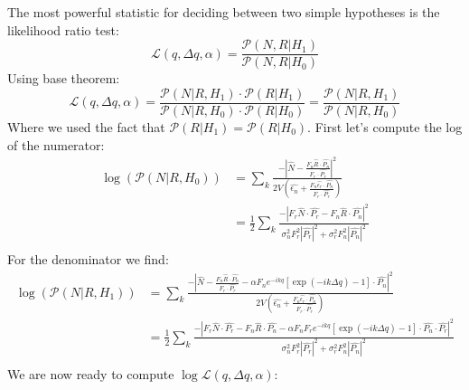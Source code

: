 \documentclass[a4paper]{article}
\newcommand{\rb}[1]{\left(#1\right)}
\newcommand{\sqb}[1]{\left[#1\right]}
\newcommand{\abs}[1]{\left|#1\right|}
\begin{document}
	The most powerful statistic for deciding between two simple hypotheses is the likelihood ratio test:
	\begin{equation}
	\mathcal{L}\rb{q,\Delta q,\alpha} = \frac{\mathcal{P}\rb{N,R|H_1}}{\mathcal{P}\rb{N,R|H_0}}
	\end{equation}
	Using base theorem:
	\begin{equation}
	\mathcal{L}\rb{q,\Delta q,\alpha} = \frac{\mathcal{P}\rb{N|R,H_1}\cdot \mathcal{P}\rb{R|H_1}}{\mathcal{P}\rb{N|R,H_0}\cdot \mathcal{P}\rb{R|H_0}} = \frac{\mathcal{P}\rb{N|R,H_1}}{\mathcal{P}\rb{N|R,H_0}}
	\end{equation}
	Where we used the fact that $\mathcal{P}\rb{R|H_1} = \mathcal{P}\rb{R|H_0}$. First let's compute the log of the numerator:
	\begin{equation}
	\begin{split}
	\log\rb{\mathcal{P}\rb{N|R,H_0}} & = \sum_k \frac{-\abs{\hat{N} - \frac{F_n \hat{R}\cdot \hat{P_n}}{F_r\cdot \hat{P_r}}}^2}{2V\rb{\hat{\epsilon_n} + \frac{F_n \hat{\epsilon_r}\cdot \hat{P_n}}{F_r\cdot \hat{P_r}}}}\\
	& = \frac{1}{2}\sum_k \frac{-\abs{F_r \hat{N} \cdot \hat{P_r} - F_n \hat{R}\cdot \hat{P_n}}^2}{\sigma^2_n F_r^2 \abs{\hat{P_r}}^2 + \sigma^2_r F_n^2 \abs{\hat{P_n}}^2}\\
	\end{split}
	\end{equation}
	For the denominator we find:
	\begin{equation}
	\begin{split}
	\log\rb{\mathcal{P}\rb{N|R,H_1}} & = \sum_k \frac{-\abs{\hat{N} - \frac{F_n \hat{R}\cdot \hat{P_n}}{F_r\cdot \hat{P_r}} - \alpha F_n e^{-ikq} \sqb{\exp\rb{-ik\Delta q} - 1}\cdot \hat{P_n}}^2}{2V\rb{\hat{\epsilon_n} + \frac{F_n \hat{\epsilon_r}\cdot \hat{P_n}}{F_r\cdot \hat{P_r}}}}\\
	& = \frac{1}{2}\sum_k \frac{-\abs{F_r \hat{N} \cdot \hat{P_r} - F_n \hat{R}\cdot \hat{P_n} - \alpha F_n F_r e^{-ikq} \sqb{\exp\rb{-ik\Delta q} - 1}\cdot \hat{P_n}\cdot \hat{P_r}}^2}{\sigma^2_n F_r^2 \abs{\hat{P_r}}^2 + \sigma^2_r F_n^2 \abs{\hat{P_n}}^2}\\
	\end{split}
	\end{equation}
	We are now ready to compute $\log{\mathcal{L}\rb{q,\Delta q,\alpha}}$:
\end{document}
